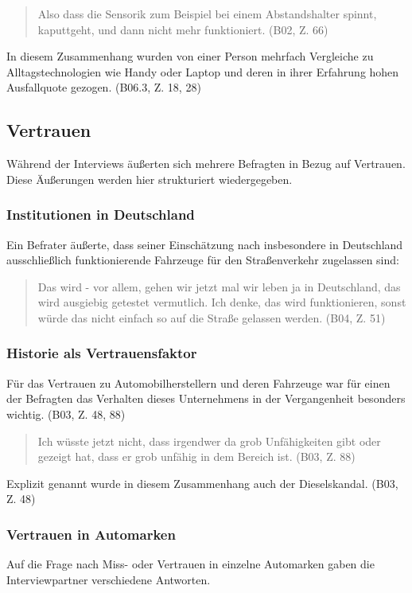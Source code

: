 \documentclass[12pt]{article}
\begin{document}
\begin{quote}
  Also dass die Sensorik zum Beispiel bei einem Abstandshalter spinnt, kaputtgeht, und dann nicht mehr funktioniert. (B02, Z. 66)
\end{quote}

In diesem Zusammenhang wurden von einer Person mehrfach Vergleiche zu Alltagstechnologien wie Handy oder Laptop und deren in ihrer Erfahrung hohen Ausfallquote gezogen. (B06.3, Z. 18, 28)


\subsection{Vertrauen}
Während der Interviews äußerten sich mehrere Befragten in Bezug auf Vertrauen. Diese Äußerungen werden hier strukturiert wiedergegeben.

\subsubsection*{Institutionen in Deutschland}
Ein Befrater äußerte, dass seiner Einschätzung nach insbesondere in Deutschland ausschließlich funktionierende Fahrzeuge für den Straßenverkehr zugelassen sind:

\begin{quote}
  Das wird - vor allem, gehen wir jetzt mal wir leben ja in Deutschland, das wird ausgiebig getestet vermutlich. Ich denke, das wird funktionieren, sonst würde das nicht einfach so auf die Straße gelassen werden. (B04, Z. 51)
\end{quote}

\subsubsection*{Historie als Vertrauensfaktor}
Für das Vertrauen zu Automobilherstellern und deren Fahrzeuge war für einen der Befragten das Verhalten dieses Unternehmens in der Vergangenheit besonders wichtig. (B03, Z. 48, 88)

\begin{quote}
  Ich wüsste jetzt nicht, dass irgendwer da grob Unfähigkeiten gibt oder gezeigt hat, dass er grob unfähig in dem Bereich ist. (B03, Z. 88)
\end{quote}

Explizit genannt wurde in diesem Zusammenhang auch der Dieselskandal. (B03, Z. 48)

\subsubsection*{Vertrauen in Automarken}
Auf die Frage nach Miss- oder Vertrauen in einzelne Automarken gaben die Interviewpartner verschiedene Antworten.
\end{document}

